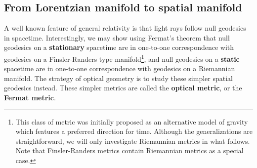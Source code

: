 \subsection{From Lorentzian manifold to spatial manifold}
A well known feature of general relativity is that light rays follow null geodesics in spacetime.
Interestingly, we may show using Fermat's theorem \cite{PerlickV1990OFpi} that null geodesics on a \textbf{stationary} spacetime are in one-to-one correspondence with geodesics on a Finsler-Randers type manifold\footnote{This class of metric was initially proposed as an alternative model of gravity which features a preferred direction for time. Although the generalizations are straightforward, we will only investigate Riemannian metrics in what follows. Note that Finsler-Randers metrics contain Riemannian metrics as a special case.}, and null geodesics on a \textbf{static} spacetime are in one-to-one correspondence with geodesics on a Riemannian manifold. The strategy of optical geometry is to study these simpler spatial geodesics instead. These simpler metrics are called the \textbf{optical metric}, or the \textbf{Fermat metric}.

